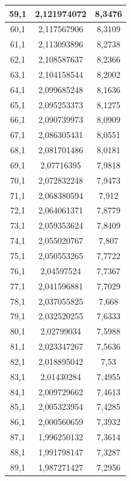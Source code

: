 \documentclass[a4paper,12pt]{article}
\begin{document}
\begin{longtable}{|c|c|c|}
        59,1 & 2,121974072 & 8,3476 \\ \hline
        60,1 & 2,117567906 & 8,3109 \\ \hline
        61,1 & 2,113093896 & 8,2738 \\ \hline
        62,1 & 2,108587637 & 8,2366 \\ \hline
        63,1 & 2,104158544 & 8,2002 \\ \hline
        64,1 & 2,099685248 & 8,1636 \\ \hline
        65,1 & 2,095253373 & 8,1275 \\ \hline
        66,1 & 2,090739973 & 8,0909 \\ \hline
        67,1 & 2,086305431 & 8,0551 \\ \hline
        68,1 & 2,081701486 & 8,0181 \\ \hline
        69,1 & 2,07716395 & 7,9818 \\ \hline
        70,1 & 2,072832248 & 7,9473 \\ \hline
        71,1 & 2,068380594 & 7,912 \\ \hline
        72,1 & 2,064061371 & 7,8779 \\ \hline
        73,1 & 2,059353624 & 7,8409 \\ \hline
        74,1 & 2,055020767 & 7,807 \\ \hline
        75,1 & 2,050553265 & 7,7722 \\ \hline
        76,1 & 2,04597524 & 7,7367 \\ \hline
        77,1 & 2,041596881 & 7,7029 \\ \hline
        78,1 & 2,037055825 & 7,668 \\ \hline
        79,1 & 2,032520255 & 7,6333 \\ \hline
        80,1 & 2,02799034 & 7,5988 \\ \hline
        81,1 & 2,023347267 & 7,5636 \\ \hline
        82,1 & 2,018895042 & 7,53 \\ \hline
        83,1 & 2,01430284 & 7,4955 \\ \hline
        84,1 & 2,009729662 & 7,4613 \\ \hline
        85,1 & 2,005323954 & 7,4285 \\ \hline
        86,1 & 2,000560659 & 7,3932 \\ \hline
        87,1 & 1,996250132 & 7,3614 \\ \hline
        88,1 & 1,991798147 & 7,3287 \\ \hline
        89,1 & 1,987271427 & 7,2956 \\ \hline

\end{longtable}
\end{document}
